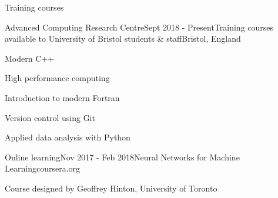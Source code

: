 \documentclass{resume} %
\begin{document}
\newpage

\begin{rSection}{Training courses}
  \begin{rSubsection}{Advanced Computing Research Centre}{Sept 2018 - Present}{Training courses available to University of Bristol students \& staff}{Bristol, England}
    \item Modern C++%
    \item High performance computing%
    \item Introduction to modern Fortran
    \item Version control using Git
    \item Applied data analysis with Python
  \end{rSubsection}

  \begin{rSubsection}{Online learning}{Nov 2017 - Feb 2018}{Neural Networks for Machine Learning}{coursera.org}
    \item Course designed by Geoffrey Hinton, University of Toronto
  \end{rSubsection}
\end{rSection}

%
%
\end{document}
